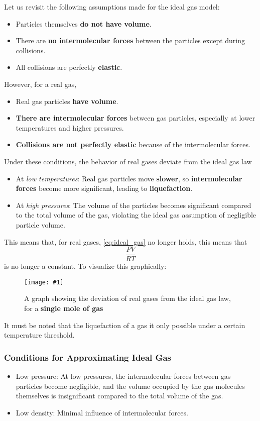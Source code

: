 \documentclass[a4paper,12pt]{article}
\newcommand{\img}[4]{\begin{center}
  \begin{figure}[H]
    \centering
    \texttt{[image: \#1]}
    \caption{#3}
    \label{fig:#4}
  \end{figure}
\end{center}}
\begin{document}
Let us revisit the following assumptions made for the ideal gas model:
\begin{itemize}
  \item Particles themselves \textbf{do not have volume}.
  \item There are \textbf{no intermolecular forces} between the particles except during collisions.
  \item All collisions are perfectly \textbf{elastic}.
\end{itemize}

However, for a real gas,
\begin{itemize}
  \item Real gas particles \textbf{have volume}.
  \item \textbf{There are intermolecular forces} between gas particles, especially at lower temperatures and higher pressures.
  \item \textbf{Collisions are not perfectly elastic} because of the intermolecular forces.
\end{itemize}
Under these conditions, the behavior of real gases deviate from the ideal gas law
\begin{itemize}
  \item At \textit{low temperatures}: Real gas particles move \textbf{slower}, so \textbf{intermolecular forces} become more significant, leading to \textbf{liquefaction}.
  \item At \textit{high pressures}: The volume of the particles becomes significant compared to the total volume of the gas, violating the ideal gas assumption of negligible particle volume.
\end{itemize}

This means that, for real gases, \cref{eq:ideal_gas} no longer holds, this means that $$\frac{PV}{RT}$$ is no longer a constant. To visualize this graphically:
\img{realgasgraph.png}{0.5}{A graph showing the deviation of real gases from the ideal gas law, for a \textbf{single mole of gas}}{real_gas}

It must be noted that the liquefaction of a gas it only possible under a certain temperature threshold.

\pagebreak

\subsubsection{Conditions for Approximating Ideal Gas}

\begin{itemize}
  \item Low pressure: At low pressures, the intermolecular forces between gas particles become negligible, and the volume occupied by the gas molecules themselves is insignificant compared to the total volume of the gas.
  \item Low density: Minimal influence of intermolecular forces.
\end{itemize}
\end{document}
